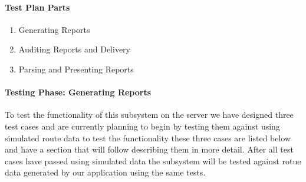 ﻿\documentclass{article}
\begin{document}
\paragraph{Test Plan Parts}
\begin{enumerate}
\item Generating Reports
\item Auditing Reports and Delivery
\item Parsing and Presenting Reports
\end{enumerate}


\paragraph{Testing Phase: Generating Reports}
To test the functionality of this subsystem on the server we have designed three test cases and are currently planning to begin by testing them against using simulated route data to test the functionality these three cases are listed below and have a section that will follow describing them in more detail. After all test cases have passed using simulated data the subsystem will be tested against rotue data generated by our application using the same tests.
\end{document}
